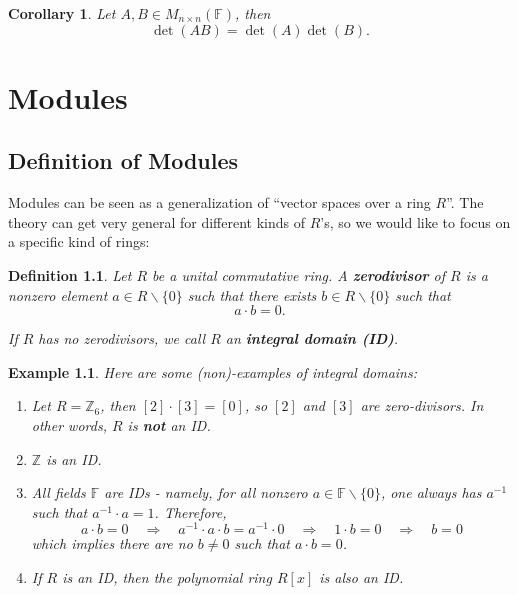 \documentclass[12pt]{amsbook}
\newtheorem{corollary}[theorem]{Corollary}
\newtheorem{definition}[theorem]{Definition}
\newtheorem{example}[theorem]{Example}
\begin{document}
\begin{corollary}
    Let $A, B \in M_{n \times n}(\mathbb{F})$, then
    $$\det(AB) = \det(A)\det(B).$$
\end{corollary}


\chapter{Modules}
\section{Definition of Modules} Modules can be seen as a generalization of ``vector spaces over a ring $R$''. The theory can get very general for different kinds of $R$'s, so we would like to focus on a specific kind of rings:
\begin{definition}
    Let $R$ be a unital commutative ring. A {\bf zerodivisor} of $R$ is a nonzero element $a \in R \backslash \{0\}$ such that there exists $b \in R\backslash \{0\}$ such that
    $$a \cdot b = 0.$$

    If $R$ has no zerodivisors, we call $R$ an {\bf integral domain (ID)}. 
\end{definition}

\begin{example}
Here are some (non)-examples of integral domains:
    \begin{enumerate}
        \item Let $R=\mathbb{Z}_{6}$, then $[2]\cdot [3]=[0]$, so $[2]$ and $[3]$ are zero-divisors. In other words, $R$ is {\bf not} an ID.
    \item $\mathbb{Z}$ is an ID.
    \item All fields $\mathbb{F}$ are IDs - namely, for all nonzero $a \in \mathbb{F} \backslash \{0\}$, one always has $a^{-1}$ such that $a^{-1} \cdot a = 1$. Therefore, 
    $$a \cdot b = 0 \quad \Rightarrow \quad a^{-1} \cdot a \cdot b = a^{-1} \cdot 0 \quad \Rightarrow \quad 1 \cdot b = 0  \quad \Rightarrow \quad b = 0$$
    which implies there are no $b \neq 0$ such that $a \cdot b = 0$.
    \item If $R$ is an ID, then the polynomial ring $R[x]$ is also an ID.
    \end{enumerate}
 \end{example}
\end{document}
